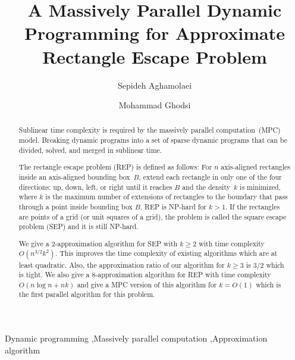 \documentclass[preprint,12pt]{elsarticle}
\begin{document}
\begin{frontmatter}
\title{A Massively Parallel Dynamic Programming for Approximate Rectangle Escape Problem}

\author[sharif,sepid]{Sepideh Aghamolaei}

\author[sharif,ghodsi]{Mohammad Ghodsi}


\begin{abstract}
Sublinear time complexity is required by the massively parallel computation~(MPC) model.
Breaking dynamic programs into a set of sparse dynamic programs that can be divided, solved, and merged in sublinear time.

The rectangle escape problem (REP) is defined as follows:
For $n$ axis-aligned rectangles inside an axis-aligned bounding box~$B$, extend each rectangle in only one of the four directions: up, down, left, or right until it reaches $B$ and the density~$k$ is minimized, where $k$ is the maximum number of extensions of rectangles to the boundary that pass through a point inside bounding box $B$.
REP is NP-hard for $k>1$.
If the rectangles are points of a grid (or unit squares of a grid), the problem is called the square escape problem (SEP) and it is still NP-hard.

We give a $2$-approximation algorithm for SEP with $k\geq2$ with time complexity $O(n^{3/2}k^2)$. This improves the time complexity of existing algorithms which are at least quadratic. Also, the approximation ratio of our algorithm for $k\geq 3$ is $3/2$ which is tight.
We also give a $8$-approximation algorithm for REP with time complexity $O(n\log n+nk)$ and give a MPC version of this algorithm for $k=O(1)$ which is the first parallel algorithm for this problem.
\end{abstract}

\begin{keyword}
Dynamic programming \sep Massively parallel computation \sep Approximation algorithm
\end{keyword}

\end{frontmatter}
\end{document}
